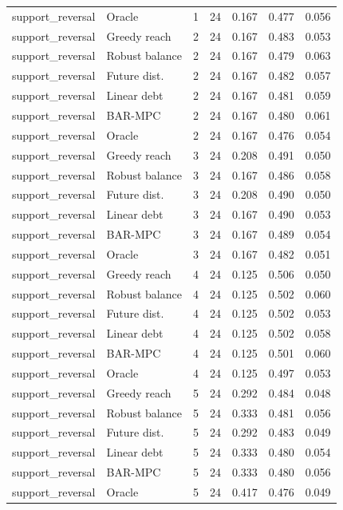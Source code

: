 \begin{longtable}{llrrrrr}
support\_reversal & Oracle & 1 & 24 & 0.167 & 0.477 & 0.056 \\
support\_reversal & Greedy reach & 2 & 24 & 0.167 & 0.483 & 0.053 \\
support\_reversal & Robust balance & 2 & 24 & 0.167 & 0.479 & 0.063 \\
support\_reversal & Future dist. & 2 & 24 & 0.167 & 0.482 & 0.057 \\
support\_reversal & Linear debt & 2 & 24 & 0.167 & 0.481 & 0.059 \\
support\_reversal & BAR-MPC & 2 & 24 & 0.167 & 0.480 & 0.061 \\
support\_reversal & Oracle & 2 & 24 & 0.167 & 0.476 & 0.054 \\
support\_reversal & Greedy reach & 3 & 24 & 0.208 & 0.491 & 0.050 \\
support\_reversal & Robust balance & 3 & 24 & 0.167 & 0.486 & 0.058 \\
support\_reversal & Future dist. & 3 & 24 & 0.208 & 0.490 & 0.050 \\
support\_reversal & Linear debt & 3 & 24 & 0.167 & 0.490 & 0.053 \\
support\_reversal & BAR-MPC & 3 & 24 & 0.167 & 0.489 & 0.054 \\
support\_reversal & Oracle & 3 & 24 & 0.167 & 0.482 & 0.051 \\
support\_reversal & Greedy reach & 4 & 24 & 0.125 & 0.506 & 0.050 \\
support\_reversal & Robust balance & 4 & 24 & 0.125 & 0.502 & 0.060 \\
support\_reversal & Future dist. & 4 & 24 & 0.125 & 0.502 & 0.053 \\
support\_reversal & Linear debt & 4 & 24 & 0.125 & 0.502 & 0.058 \\
support\_reversal & BAR-MPC & 4 & 24 & 0.125 & 0.501 & 0.060 \\
support\_reversal & Oracle & 4 & 24 & 0.125 & 0.497 & 0.053 \\
support\_reversal & Greedy reach & 5 & 24 & 0.292 & 0.484 & 0.048 \\
support\_reversal & Robust balance & 5 & 24 & 0.333 & 0.481 & 0.056 \\
support\_reversal & Future dist. & 5 & 24 & 0.292 & 0.483 & 0.049 \\
support\_reversal & Linear debt & 5 & 24 & 0.333 & 0.480 & 0.054 \\
support\_reversal & BAR-MPC & 5 & 24 & 0.333 & 0.480 & 0.056 \\
support\_reversal & Oracle & 5 & 24 & 0.417 & 0.476 & 0.049 \\

\end{longtable}
